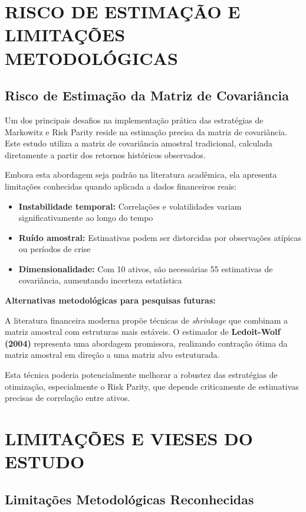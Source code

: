 \section{RISCO DE ESTIMAÇÃO E LIMITAÇÕES METODOLÓGICAS}

\subsection{Risco de Estimação da Matriz de Covariância}

Um dos principais desafios na implementação prática das estratégias de Markowitz e Risk Parity reside na estimação precisa da matriz de covariância. Este estudo utiliza a matriz de covariância amostral tradicional, calculada diretamente a partir dos retornos históricos observados.

Embora esta abordagem seja padrão na literatura acadêmica, ela apresenta limitações conhecidas quando aplicada a dados financeiros reais:

\begin{itemize}
    \item \textbf{Instabilidade temporal:} Correlações e volatilidades variam significativamente ao longo do tempo
    \item \textbf{Ruído amostral:} Estimativas podem ser distorcidas por observações atípicas ou períodos de crise
    \item \textbf{Dimensionalidade:} Com 10 ativos, são necessárias 55 estimativas de covariância, aumentando incerteza estatística
\end{itemize}

\textbf{Alternativas metodológicas para pesquisas futuras:}

A literatura financeira moderna propõe técnicas de \textit{shrinkage} que combinam a matriz amostral com estruturas mais estáveis. O estimador de \textbf{Ledoit-Wolf (2004)} representa uma abordagem promissora, realizando contração ótima da matriz amostral em direção a uma matriz alvo estruturada.

Esta técnica poderia potencialmente melhorar a robustez das estratégias de otimização, especialmente o Risk Parity, que depende criticamente de estimativas precisas de correlação entre ativos.

\section{LIMITAÇÕES E VIESES DO ESTUDO}

\subsection{Limitações Metodológicas Reconhecidas}


